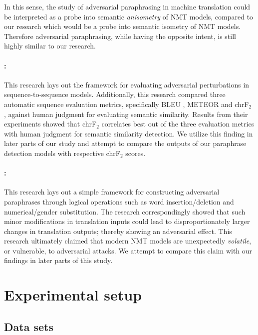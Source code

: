 \documentclass[11pt,a4paper]{article}
\begin{document}
In this sense, the study of adversarial paraphrasing in machine translation could be interpreted as a probe into semantic \textit{anisometry} of NMT models, compared to our research which would be a probe into semantic isometry of NMT models. Therefore adversarial paraphrasing, while having the opposite intent, is still highly similar to our research.

\paragraph{\citet{michel2019evaluation}:} This research lays out the framework for evaluating adversarial perturbations in sequence-to-sequence models. Additionally, this research compared three automatic sequence evaluation metrics, specifically BLEU \cite{papineni2002bleu}, METEOR \cite{denkowski2014meteor} and chrF$_2$ \cite{popovic2015chrf}, against human judgment for evaluating semantic similarity. Results from their experiments showed that chrF$_2$ correlates best out of the three evaluation metrics with human judgment for semantic similarity detection. We utilize this finding in later parts of our study and attempt to compare the outputs of our paraphrase detection models with respective chrF$_2$ scores.

\paragraph{\citet{fadaee2020unreasonable}:} This research lays out a simple framework for constructing adversarial paraphrases through logical operations such as word insertion/deletion and numerical/gender substitution. The research correspondingly showed that such minor modifications in translation inputs could lead to disproportionately larger changes in translation outputs; thereby showing an adversarial effect. This research ultimately claimed that modern NMT models are unexpectedly \textit{volatile}, or vulnerable, to adversarial attacks. We attempt to compare this claim with our findings in later parts of this study. 

\section{Experimental setup}

\subsection{Data sets}
\end{document}
